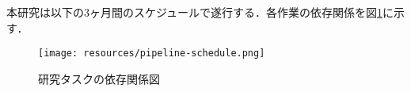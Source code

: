 \documentclass[twocolumn]{jarticle}
\begin{document}


本研究は以下の3ヶ月間のスケジュールで遂行する．各作業の依存関係を図\ref{fig:placeholder}に示す．
\begin{figure}[H]
    \centering
    \texttt{[image: resources/pipeline-schedule.png]}
    \caption{研究タスクの依存関係図}
    \label{fig:placeholder}
\end{figure}

\end{document}
